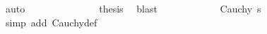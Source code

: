 \begin{isabellebody}
\ auto\isanewline
\ \ \ \ \ \ \isacommand{{\isacharbraceright}{\kern0pt}}\isamarkupfalse%
\isanewline
\ \ \ \ \ \ \isamarkupfalse%
\ {\isacharquery}{\kern0pt}thesis\ \isamarkupfalse%
\ blast\isanewline
\ \ \ \ \isamarkupfalse%
\isanewline
\ \ \ \ \isamarkupfalse%
\ \isamarkupfalse%
\ {\isachardoublequoteopen}Cauchy\ s{\isachardoublequoteclose}\ \isamarkupfalse%
\ {\isacharparenleft}{\kern0pt}simp\ add{\isacharcolon}{\kern0pt}\ Cauchy{\isacharunderscore}{\kern0pt}def{\isacharparenright}{\kern0pt}\isanewline
\ \ \isamarkupfalse%
\ \ \ \ \ \ \ \ \ \ \ \ \isanewline
{}\isamarkupfalse%
%
\endisatagproof
{\isafoldproof}%
%
\isadelimproof
\isanewline
%
\endisadelimproof
\isanewline
%
\isadelimtheory
\ \ \isanewline
%
\endisadelimtheory
%
\isatagtheory
{}\isamarkupfalse%
%
\endisatagtheory
{\isafoldtheory}%
%
\isadelimtheory
%
\endisadelimtheory
%
\end{isabellebody}%
\endinput
